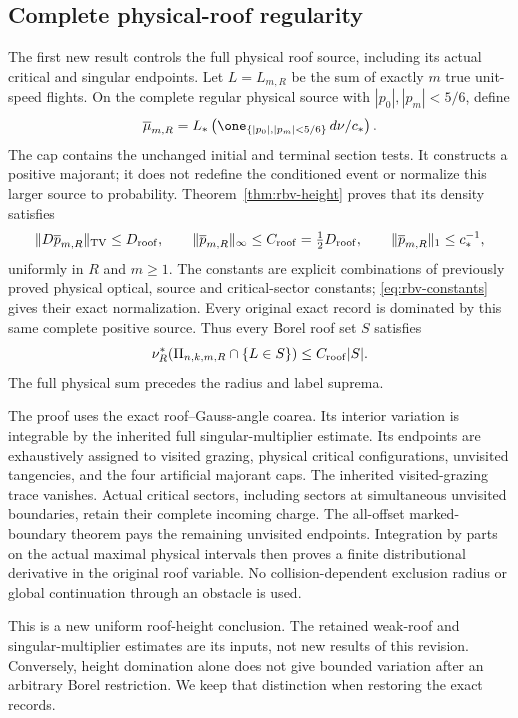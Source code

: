 \subsection*{Complete physical-roof regularity}
The first new result controls the full physical roof source, including
its actual critical and singular endpoints. Let $L=L_{m,R}$ be the
sum of exactly $m$ true unit-speed flights. On the complete regular
physical source with $|p_0|,|p_m|<5/6$, define
\[
 \overline\mu_{m,R}
 =L_*\left(\one_{\{|p_0|,|p_m|<5/6\}}\,d\nu/c_*\right).
\]
The cap contains the unchanged initial and terminal section tests.
It constructs a positive majorant; it does not redefine the
conditioned event or normalize this larger source to probability.
Theorem~\ref{thm:rbv-height} proves that its density satisfies
\begin{equation}\label{eq:intro-complete-roof}
 \|D\overline p_{m,R}\|_{\rm TV}\le D_{\rm roof},\qquad
 \|\overline p_{m,R}\|_\infty\le C_{\rm roof}
       =\tfrac12D_{\rm roof},\qquad
 \|\overline p_{m,R}\|_1\le c_*^{-1},
\end{equation}
uniformly in $R$ and $m\ge1$. The constants are explicit combinations
of previously proved physical optical, source and critical-sector
constants; \eqref{eq:rbv-constants} gives their exact normalization.
Every original exact record is dominated by this same complete
positive source. Thus every Borel roof set $S$ satisfies
\[
 \nu_R^*(\Pi_{n,k,m,R}\cap\{L\in S\})\le C_{\rm roof}|S|.
\]
The full physical sum precedes the radius and label suprema.

The proof uses the exact roof--Gauss-angle coarea. Its interior
variation is integrable by the inherited full singular-multiplier
estimate. Its endpoints are exhaustively assigned to visited
grazing, physical critical configurations, unvisited tangencies,
and the four artificial majorant caps. The inherited visited-grazing
trace vanishes. Actual critical sectors, including sectors at
simultaneous unvisited boundaries, retain their complete incoming
charge. The all-offset marked-boundary theorem pays the remaining
unvisited endpoints. Integration by parts on the actual maximal
physical intervals then proves a finite distributional derivative
in the original roof variable. No collision-dependent exclusion
radius or global continuation through an obstacle is used.

This is a new uniform roof-height conclusion. The retained
weak-roof and singular-multiplier estimates are its inputs, not new
results of this revision. Conversely, height domination alone does
not give bounded variation after an arbitrary Borel restriction.
We keep that distinction when restoring the exact records.


